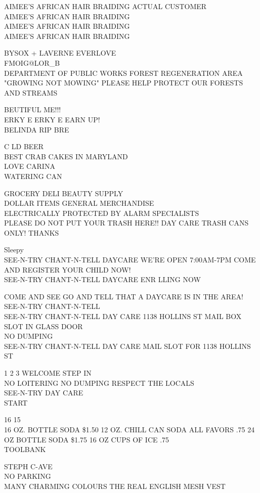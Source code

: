 \documentclass[10pt,letterpaper]{article}
\begin{document}
AIMEE'S AFRICAN HAIR BRAIDING ACTUAL CUSTOMER\\
AIMEE'S AFRICAN HAIR BRAIDING\\
AIMEE'S AFRICAN HAIR BRAIDING\\
AIMEE'S AFRICAN HAIR BRAIDING

BYSOX + LAVERNE EVERLOVE\\
FMOIG@LOR\_B\\
DEPARTMENT OF PUBLIC WORKS FOREST REGENERATION AREA "GROWING NOT MOWING" PLEASE HELP PROTECT OUR FORESTS AND STREAMS

BEUTIFUL ME!!!\\
ERKY E ERKY E EARN UP!\\
BELINDA RIP BRE

C LD BEER\\
BEST CRAB CAKES IN MARYLAND\\
LOVE CARINA\\
WATERING CAN

GROCERY DELI BEAUTY SUPPLY\\
DOLLAR ITEMS GENERAL MERCHANDISE\\
ELECTRICALLY PROTECTED BY ALARM SPECIALISTS\\
PLEASE DO NOT PUT YOUR TRASH HERE!! DAY CARE TRASH CANS ONLY!  THANKS

Sleepy\\
SEE{-}N{-}TRY CHANT{-}N{-}TELL DAYCARE WE'RE OPEN 7:00AM{-}7PM COME AND REGISTER YOUR CHILD NOW!\\
SEE{-}N{-}TRY CHANT{-}N{-}TELL DAYCARE ENR LLING NOW

COME AND SEE GO AND TELL THAT A DAYCARE IS IN THE AREA!  SEE{-}N{-}TRY CHANT{-}N{-}TELL\\
SEE{-}N{-}TRY CHANT{-}N{-}TELL DAY CARE 1138 HOLLINS ST MAIL BOX SLOT IN GLASS DOOR\\
NO DUMPING\\
SEE{-}N{-}TRY CHANT{-}N{-}TELL DAY CARE MAIL SLOT FOR 1138 HOLLINS ST

1 2 3 WELCOME STEP IN\\
NO LOITERING NO DUMPING RESPECT THE LOCALS\\
SEE{-}N{-}TRY DAY CARE\\
START

16 15\\
16 OZ. BOTTLE SODA \$1.50 12 OZ. CHILL CAN SODA ALL FAVORS .75 24 OZ BOTTLE SODA \$1.75 16 OZ CUPS OF ICE .75\\
TOOLBANK

STEPH C{-}AVE\\
NO PARKING\\
MANY CHARMING COLOURS THE REAL ENGLISH MESH VEST
\end{document}
